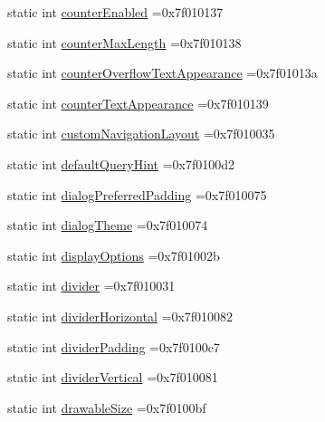 \begin{DoxyCompactItemize}
static int \hyperlink{classandroid_1_1support_1_1graphics_1_1drawable_1_1R_1_1attr_a9c0cfdd06cacc115964341d2809ec6cf}{counter\+Enabled} =0x7f010137
\item 
static int \hyperlink{classandroid_1_1support_1_1graphics_1_1drawable_1_1R_1_1attr_a16956f62a64eb3c1c1a238892790a5e4}{counter\+Max\+Length} =0x7f010138
\item 
static int \hyperlink{classandroid_1_1support_1_1graphics_1_1drawable_1_1R_1_1attr_a75aecb525f12edc568e4337d316eb08f}{counter\+Overflow\+Text\+Appearance} =0x7f01013a
\item 
static int \hyperlink{classandroid_1_1support_1_1graphics_1_1drawable_1_1R_1_1attr_abdfe047dc453bc86dfe7a9b6d662f470}{counter\+Text\+Appearance} =0x7f010139
\item 
static int \hyperlink{classandroid_1_1support_1_1graphics_1_1drawable_1_1R_1_1attr_aeda3e6161d8cc3ba7878e10ae152297d}{custom\+Navigation\+Layout} =0x7f010035
\item 
static int \hyperlink{classandroid_1_1support_1_1graphics_1_1drawable_1_1R_1_1attr_a0dc2f59682ad9f379c7ff355eea0a709}{default\+Query\+Hint} =0x7f0100d2
\item 
static int \hyperlink{classandroid_1_1support_1_1graphics_1_1drawable_1_1R_1_1attr_a61c6d162e1c5d02dd124e15467059609}{dialog\+Preferred\+Padding} =0x7f010075
\item 
static int \hyperlink{classandroid_1_1support_1_1graphics_1_1drawable_1_1R_1_1attr_a56b0592441b0ef3d71513073e1c7fd55}{dialog\+Theme} =0x7f010074
\item 
static int \hyperlink{classandroid_1_1support_1_1graphics_1_1drawable_1_1R_1_1attr_aaac1762d1c3eb6018780b70a36631012}{display\+Options} =0x7f01002b
\item 
static int \hyperlink{classandroid_1_1support_1_1graphics_1_1drawable_1_1R_1_1attr_a7e6802e202ef19d78571d292a9a625c4}{divider} =0x7f010031
\item 
static int \hyperlink{classandroid_1_1support_1_1graphics_1_1drawable_1_1R_1_1attr_adb87a43c21b1e787bd6bd10eaf3d3b57}{divider\+Horizontal} =0x7f010082
\item 
static int \hyperlink{classandroid_1_1support_1_1graphics_1_1drawable_1_1R_1_1attr_a3c2e4b827f0c9c6ec0495d87d61b0215}{divider\+Padding} =0x7f0100c7
\item 
static int \hyperlink{classandroid_1_1support_1_1graphics_1_1drawable_1_1R_1_1attr_a5dd7c90a679e2d22830b86652162a7c9}{divider\+Vertical} =0x7f010081
\item 
static int \hyperlink{classandroid_1_1support_1_1graphics_1_1drawable_1_1R_1_1attr_aebafbebda3c4a80447486a3ee731207a}{drawable\+Size} =0x7f0100bf

\end{DoxyCompactItemize}
